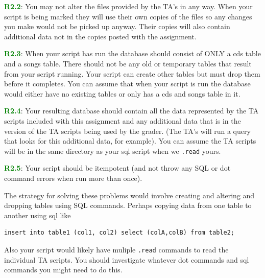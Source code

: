 \documentclass[12pt]{article}
\begin{document}
\textcolor{green}{\textbf{R2.2}}: You may not alter the files provided by the TA's in any way. When your script is being marked they will use their own copies of the files so any changes you make would not be picked up anyway. Their copies will also contain additional data not in the copies posted with the assignment.

\textcolor{green}{\textbf{R2.3}}: When your script has run the database should consist of ONLY a cds table and a songs table. There should not be any old or temporary tables that result from your script running. Your script can create other tables but must drop them before it completes. You can assume that when your script is run the database would either have no existing tables or only has a cds and songs table in it.

\textcolor{green}{\textbf{R2.4}}: Your resulting database should contain all the data represented by the TA scripts included with this assignment and any additional data that is in the version of the TA scripts being used by the grader. (The TA's will run a query that looks for this additional data, for example). You can assume the TA scripts will be in the same directory as your sql script when we \texttt{.read} yours.

\textcolor{green}{\textbf{R2.5}}: Your script should be itempotent (and not throw any SQL or dot command errors when run more than once).

The strategy for solving these problems would involve creating and altering and dropping tables using SQL commands. Perhaps copying data from one table to another using sql like
\begin{lstlisting}[style=sqlstyle]
insert into table1 (col1, col2) select (colA,colB) from table2;
\end{lstlisting}

Also your script would likely have muliple \texttt{.read} commands to read the individual TA scripts. You should investigate whatever dot commands and sql commands you might need to do this.
\end{document}

